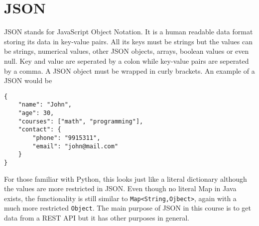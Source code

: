 \graphicspath{{./lab03/Images/}}


\maketocpage

\section{JSON}
JSON stands for JavaScript Object Notation. It is a human readable data format storing its data in key-value pairs. All its keys must be strings but the values can be strings, numerical values, other JSON objects, arrays, boolean values or even null. Key and value are seperated by a colon while key-value pairs are seperated by a comma. A JSON object must be wrapped in curly brackets. An example of a JSON would be
\begin{lstlisting}[style=A_JAVA]
{
	"name": "John",
	"age": 30,
	"courses": ["math", "programming"],
	"contact": {
		"phone": "9915311",
		"email": "john@mail.com"
	}
}
\end{lstlisting}
For those familiar with Python, this looks just like a literal dictionary although the values are more restricted in JSON. Even though no literal Map in Java exists, the functionality is still similar to \texttt{Map<String,Ojbect>}, again with a much more restricted \texttt{Object}. The main purpose of JSON in this course is to get data from a REST API but it has other purposes in general.

